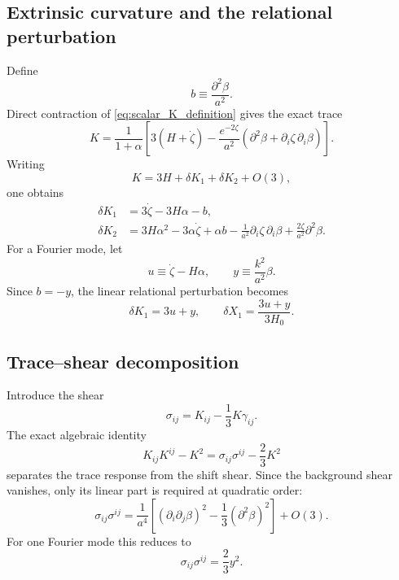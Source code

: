 \documentclass[11pt,a4paper]{article}
\begin{document}
\subsection{Extrinsic curvature and the relational perturbation}

Define
\begin{equation}
b\equiv\frac{\partial^2\beta}{a^2}.
\end{equation}
Direct contraction of \eqref{eq:scalar_K_definition} gives the exact trace
\begin{equation}
K=
\frac{1}{1+\alpha}
\left[
3(H+\dot\zeta)
-\frac{e^{-2\zeta}}{a^2}
\left(\partial^2\beta+\partial_i\zeta\,\partial_i\beta\right)
\right].
\label{eq:exact_K_scalar}
\end{equation}
Writing
\begin{equation}
K=3H+\delta K_1+\delta K_2+O(3),
\end{equation}
one obtains
\begin{align}
\delta K_1
&=
3\dot\zeta-3H\alpha-b,
\label{eq:deltaK1}
\\
\delta K_2
&=
3H\alpha^2-3\alpha\dot\zeta+\alpha b
-\frac{1}{a^2}\partial_i\zeta\,\partial_i\beta
+\frac{2\zeta}{a^2}\partial^2\beta.
\label{eq:deltaK2}
\end{align}
For a Fourier mode, let
\begin{equation}
u\equiv\dot\zeta-H\alpha,
\qquad
y\equiv\frac{k^2}{a^2}\beta.
\label{eq:u_y_def}
\end{equation}
Since \(b=-y\), the linear relational perturbation becomes
\begin{equation}
\boxed{\delta K_1=3u+y},
\qquad
\delta X_1=\frac{3u+y}{3H_0}.
\label{eq:deltaK1_uy}
\end{equation}

\subsection{Trace--shear decomposition}

Introduce the shear
\begin{equation}
\sigma_{ij}=K_{ij}-\frac{1}{3}K\gamma_{ij}.
\end{equation}
The exact algebraic identity
\begin{equation}
K_{ij}K^{ij}-K^2
=
\sigma_{ij}\sigma^{ij}-\frac{2}{3}K^2
\label{eq:trace_shear_identity}
\end{equation}
separates the trace response from the shift shear.  Since the background shear
vanishes, only its linear part is required at quadratic order:
\begin{equation}
\sigma_{ij}\sigma^{ij}
=
\frac{1}{a^4}
\left[
(\partial_i\partial_j\beta)^2
-\frac{1}{3}(\partial^2\beta)^2
\right]+O(3).
\label{eq:shear_square_position}
\end{equation}
For one Fourier mode this reduces to
\begin{equation}
\boxed{
\sigma_{ij}\sigma^{ij}=\frac{2}{3}y^2
}.
\label{eq:shear_square_fourier}
\end{equation}
\end{document}
